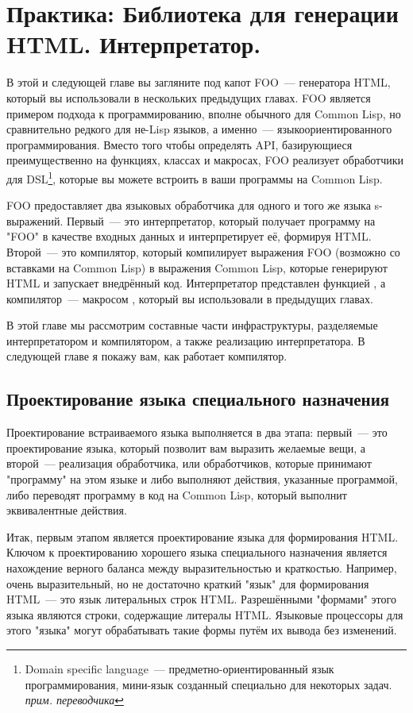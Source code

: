 \chapter{Практика: Библиотека для генерации HTML. Интерпретатор.}
\label{ch:30}

В этой и следующей главе вы загляните под капот FOO~--- генератора HTML, который вы
использовали в нескольких предыдущих главах. FOO является примером подхода к
программированию, вполне обычного для Common Lisp, но сравнительно редкого для не-Lisp
языков, а именно~--- языкоориентированного программирования. Вместо того чтобы определять
API, базирующиеся преимущественно на функциях, классах и макросах, FOO реализует
обработчики для DSL\footnote{Domain specific language~--- предметно-ориентированный язык
  программирования, мини-язык созданный специально для некоторых задач.
  \textit{прим. переводчика}}, которые вы можете встроить в ваши программы на Common Lisp.

FOO предоставляет два языковых обработчика для одного и того же языка
s-выражений. Первый~--- это интерпретатор, который получает программу на "FOO" в качестве
входных данных и интерпретирует её, формируя HTML. Второй~--- это компилятор, который
компилирует выражения FOO (возможно со вставками на Common Lisp) в выражения Common Lisp,
которые генерируют HTML и запускает внедрённый код. Интерпретатор представлен функцией
, а компилятор~--- макросом , который вы использовали в
предыдущих главах.

В этой главе мы рассмотрим составные части инфраструктуры, разделяемые интерпретатором и
компилятором, а также реализацию интерпретатора. В следующей главе я покажу вам, как
работает компилятор.

\section{Проектирование языка специального назначения}

Проектирование встраиваемого языка выполняется в два этапа: первый~--- это проектирование
языка, который позволит вам выразить желаемые вещи, а второй~--- реализация обработчика,
или обработчиков, которые принимают "программу" на этом языке и либо выполняют действия,
указанные программой, либо переводят программу в код на Common Lisp, который выполнит
эквивалентные действия.

Итак, первым этапом является проектирование языка для формирования HTML. Ключом к
проектированию хорошего языка специального назначения является нахождение верного баланса
между выразительностью и краткостью. Например, очень выразительный, но не достаточно
краткий "язык" для формирования HTML~--- это язык литеральных строк HTML. Разрешёнными
"формами" этого языка являются строки, содержащие литералы HTML.  Языковые процессоры для
этого "языка" могут обрабатывать такие формы путём их вывода без изменений.

